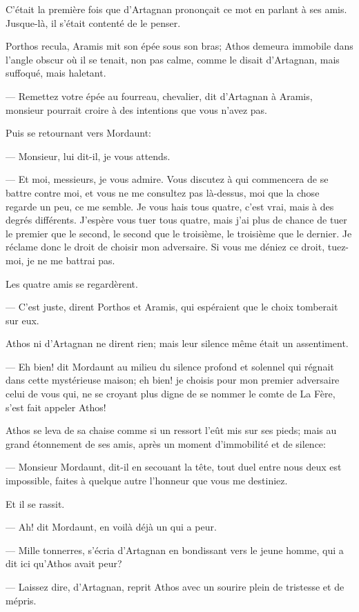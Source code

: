 C'était la première fois que d'Artagnan prononçait ce mot en parlant à ses amis. Jusque-là, il s'était contenté de le penser.

Porthos recula, Aramis mit son épée sous son bras; Athos demeura immobile dans l'angle obscur où il se tenait, non pas calme, comme le disait d'Artagnan, mais suffoqué, mais haletant.

— Remettez votre épée au fourreau, chevalier, dit d'Artagnan à Aramis, monsieur pourrait croire à des intentions que vous n'avez pas.

Puis se retournant vers Mordaunt:

— Monsieur, lui dit-il, je vous attends.

— Et moi, messieurs, je vous admire. Vous discutez à qui commencera de se battre contre moi, et vous ne me consultez pas là-dessus, moi que la chose regarde un peu, ce me semble. Je vous hais tous quatre, c'est vrai, mais à des degrés différents. J'espère vous tuer tous quatre, mais j'ai plus de chance de tuer le premier que le second, le second que le troisième, le troisième que le dernier. Je réclame donc le droit de choisir mon adversaire. Si vous me déniez ce droit, tuez-moi, je ne me battrai pas.

Les quatre amis se regardèrent.

— C'est juste, dirent Porthos et Aramis, qui espéraient que le choix tomberait sur eux.

Athos ni d'Artagnan ne dirent rien; mais leur silence même était un assentiment.

— Eh bien! dit Mordaunt au milieu du silence profond et solennel qui régnait dans cette mystérieuse maison; eh bien! je choisis pour mon premier adversaire celui de vous qui, ne se croyant plus digne de se nommer le comte de La Fère, s'est fait appeler Athos!

Athos se leva de sa chaise comme si un ressort l'eût mis sur ses pieds; mais au grand étonnement de ses amis, après un moment d'immobilité et de silence:

— Monsieur Mordaunt, dit-il en secouant la tête, tout duel entre nous deux est impossible, faites à quelque autre l'honneur que vous me destiniez.

Et il se rassit.

— Ah! dit Mordaunt, en voilà déjà un qui a peur.

— Mille tonnerres, s'écria d'Artagnan en bondissant vers le jeune homme, qui a dit ici qu'Athos avait peur?

— Laissez dire, d'Artagnan, reprit Athos avec un sourire plein de tristesse et de mépris.

